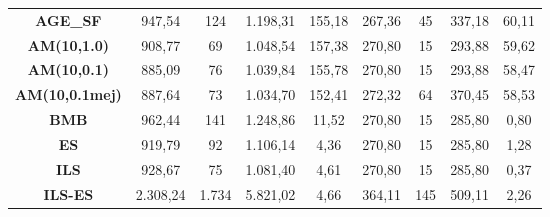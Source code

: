 \begin{table}[H]
{\begin{tabular}{ccccccccc}
\multicolumn{1}{|c|}{\textbf{AGE\_SF}} & 947,54 & 124 & 1.198,31 & \multicolumn{1}{c|}{155,18} & 267,36 & 45 & 337,18 & \multicolumn{1}{c|}{60,11} \\
\multicolumn{1}{|c|}{\textbf{AM(10,1.0)}} & 908,77 & 69 & 1.048,54 & \multicolumn{1}{c|}{157,38} & 270,80 & 15 & 293,88 & \multicolumn{1}{c|}{59,62} \\
\multicolumn{1}{|c|}{\textbf{AM(10,0.1)}} & 885,09 & 76 & 1.039,84 & \multicolumn{1}{c|}{155,78} & 270,80 & 15 & 293,88 & \multicolumn{1}{c|}{58,47} \\
\multicolumn{1}{|c|}{\textbf{AM(10,0.1mej)}} & 887,64 & 73 & 1.034,70 & \multicolumn{1}{c|}{152,41} & 272,32 & 64 & 370,45 & \multicolumn{1}{c|}{58,53} \\
\multicolumn{1}{|c|}{\textbf{BMB}} & 962,44 & 141 & 1.248,86 & \multicolumn{1}{c|}{11,52} & 270,80 & 15 & 285,80 & \multicolumn{1}{c|}{0,80} \\
\multicolumn{1}{|c|}{\textbf{ES}} & 919,79 & 92 & 1.106,14 & \multicolumn{1}{c|}{4,36} & 270,80 & 15 & 285,80 & \multicolumn{1}{c|}{1,28} \\
\multicolumn{1}{|c|}{\textbf{ILS}} & 928,67 & 75 & 1.081,40 & \multicolumn{1}{c|}{4,61} & 270,80 & 15 & 285,80 & \multicolumn{1}{c|}{0,37} \\
\multicolumn{1}{|c|}{\textbf{ILS-ES}} & 2.308,24 & 1.734 & 5.821,02 & \multicolumn{1}{c|}{4,66} & 364,11 & 145 & 509,11 & \multicolumn{1}{c|}{2,26} \\ \hline
\end{tabular}%
}
\end{table}


